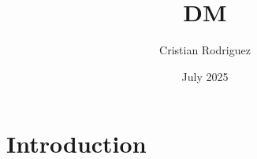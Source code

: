 \documentclass{article}
\title{DM}
\author{Cristian Rodriguez}
\date{July 2025}
\begin{document}
\maketitle

\section{Introduction}
\end{document}
